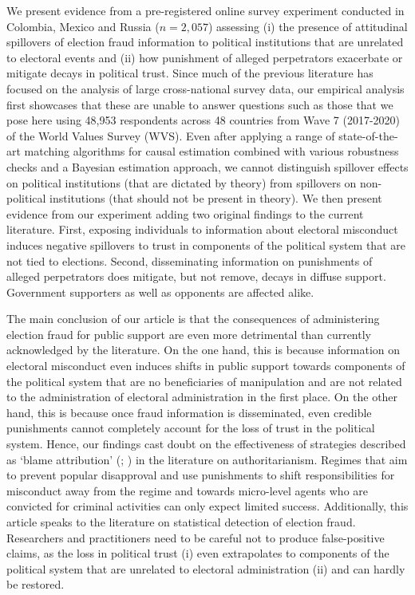 \documentclass[11pt, ngerman,english,a4]{article}
\begin{document}
We present evidence from a pre-registered online survey experiment conducted in Colombia, Mexico and Russia ($n=2,057$) assessing (i) the presence of attitudinal spillovers of election fraud information to political institutions that are unrelated to electoral events and (ii) how punishment of alleged perpetrators exacerbate or mitigate decays in political trust. Since much of the previous literature has focused on the analysis of large cross-national survey data, our empirical analysis first showcases that these are unable to answer questions such as those that we pose here using 48,953 respondents across 48 countries from Wave 7 (2017-2020) of the World Values Survey (WVS). Even after applying a range of state-of-the-art matching algorithms for causal estimation combined with various robustness checks and a Bayesian estimation approach, we cannot distinguish spillover effects on political institutions (that are dictated by theory) from spillovers on non-political institutions (that should not be present in theory). We then present evidence from our experiment adding two original findings to the current literature. First, exposing individuals to information about electoral misconduct induces negative spillovers to trust in components of the political system that are not tied to elections. Second, disseminating information on punishments of alleged perpetrators does mitigate, but not remove, decays in diffuse support. Government supporters as well as opponents are affected alike. 

The main conclusion of our article is that the consequences of administering election fraud for public support are even more detrimental than currently acknowledged by the literature. On the one hand, this is because information on electoral misconduct even induces shifts in public support towards components of the political system that are no beneficiaries of manipulation and are not related to the administration of electoral administration in the first place. On the other hand, this is because once fraud information is disseminated, even credible punishments cannot completely account for the loss of trust in the political system. Hence, our findings cast doubt on the effectiveness of strategies described as `blame attribution' (\citealt{Beazer2019}; \citealt{Rozenas2019b}) in the literature on authoritarianism. Regimes that aim to prevent popular disapproval and use punishments to shift responsibilities for misconduct away from the regime and towards micro-level agents who are convicted for criminal activities can only expect limited success. Additionally, this article speaks to the literature on statistical detection of election fraud. Researchers and practitioners need to be careful not to produce false-positive claims, as the loss in political trust (i) even extrapolates to components of the political system that are unrelated to electoral administration (ii) and can hardly be restored. 
\end{document}
